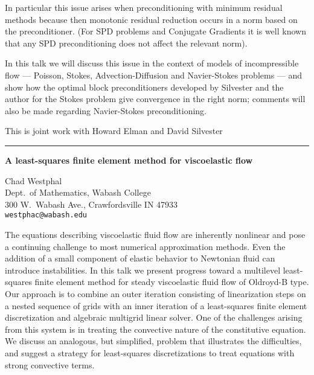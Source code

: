 \documentclass[twosided]{report}
\begin{document}
In particular this issue arises
when preconditioning with minimum residual methods because
then monotonic residual reduction occurs in a norm based on
the preconditioner. (For SPD problems and Conjugate
Gradients it is well known that any SPD preconditioning does
not affect the relevant norm). 

In this talk we will
discuss this issue in the context of models of
incompressible flow --- Poisson, Stokes, Advection-Diffusion
and Navier-Stokes problems --- and show how the optimal block
preconditioners developed by Silvester and the author for
the Stokes problem give convergence in the right norm;
comments will also be made regarding Navier-Stokes
preconditioning.

This is joint work with Howard Elman
and David Silvester



	\begin{center} \rule{6in}{1pt} \end{center}

\begin{center}
{\large			%
{\bf A least-squares finite element method for viscoelastic flow}}

	Chad Westphal \\
	Dept.~of Mathematics, Wabash College \\
	300 W.~Wabash Ave., Crawfordsville IN 47933 \\
	{\tt westphac@wabash.edu}
\end{center}
The equations describing viscoelastic fluid flow are
inherently nonlinear and pose a continuing challenge to most
numerical approximation methods. Even the addition of a
small component of elastic behavior to Newtonian fluid can
introduce instabilities. In this talk we present progress
toward a multilevel least-squares finite element method for
steady viscoelastic fluid flow of Oldroyd-B type. Our
approach is to combine an outer iteration consisting of
linearization steps on a nested sequence of grids with an
inner iteration of a least-squares finite element
discretization and algebraic multigrid linear solver. One of
the challenges arising from this system is in treating the
convective nature of the constitutive equation. We discuss
an analogous, but simplified, problem that illustrates the
difficulties, and suggest a strategy for least-squares
discretizations to treat equations with strong convective
terms.
\end{document}
